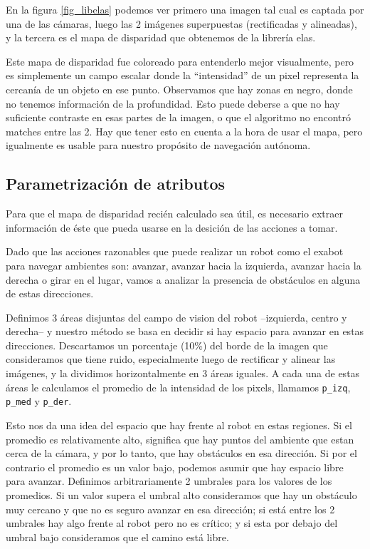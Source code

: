 \documentclass[journal,a4paper]{IEEEtran}
\begin{document}
En la figura \ref{fig_libelas} podemos ver primero una imagen tal cual es captada por una de las cámaras, luego las 2 imágenes superpuestas (rectificadas y alineadas), y la tercera es el mapa de disparidad que obtenemos de la librería elas.

Este mapa de disparidad fue coloreado para entenderlo mejor visualmente, pero es simplemente un campo escalar donde la ``intensidad'' de un pixel representa la cercanía de un objeto en ese punto.
Observamos que hay zonas en negro, donde no tenemos información de la profundidad. Esto puede deberse a que no hay suficiente contraste en esas partes de la imagen, o que el algoritmo no encontró matches entre las 2. Hay que tener esto en cuenta a la hora de usar el mapa, pero igualmente es usable para nuestro propósito de navegación autónoma.

\subsection{Parametrización de atributos}
Para que el mapa de disparidad recién calculado sea útil, es necesario extraer información de éste que pueda usarse en la desición de las acciones a tomar.

Dado que las acciones razonables que puede realizar un robot como el exabot para navegar ambientes son: avanzar, avanzar hacia la izquierda, avanzar hacia la derecha o girar en el lugar, vamos a analizar la presencia de obstáculos en alguna de estas direcciones.

Definimos 3 áreas disjuntas del campo de vision del robot --izquierda, centro y derecha-- y nuestro método se basa en decidir si hay espacio para avanzar en estas direcciones.
Descartamos un porcentaje (10\%) del borde de la imagen que consideramos que tiene ruido, especialmente luego de rectificar y alinear las imágenes, y la dividimos horizontalmente en 3 áreas iguales.
A cada una de estas áreas le calculamos el promedio de la intensidad de los pixels, llamamos \texttt{p\_izq}, \texttt{p\_med} y \texttt{p\_der}.

Esto nos da una idea del espacio que hay frente al robot en estas regiones.
Si el promedio es relativamente alto, significa que hay puntos del ambiente que estan cerca de la cámara, y por lo tanto, que hay obstáculos en esa dirección.
Si por el contrario el promedio es un valor bajo, podemos asumir que hay espacio libre para avanzar.
Definimos arbitrariamente 2 umbrales para los valores de los promedios. Si un valor supera el umbral alto consideramos que hay un obstáculo muy cercano y que no es seguro avanzar en esa dirección; si está entre los 2 umbrales hay algo frente al robot pero no es crítico; y si esta por debajo del umbral bajo consideramos que el camino está libre.
\end{document}
